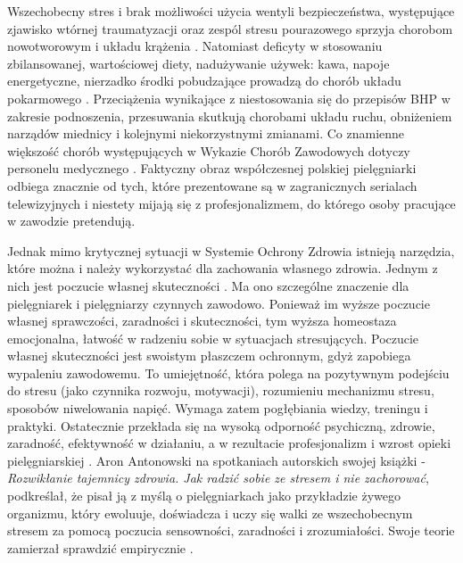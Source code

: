 \documentclass[a4paper,12pt,twoside,openright]{mwrep}
\begin{document}
Wszechobecny stres i brak możliwości użycia wentyli bezpieczeństwa, występujące zjawisko wtórnej traumatyzacji oraz zespól stresu pourazowego sprzyja chorobom nowotworowym i układu krążenia \cite{skutki}. Natomiast deficyty w stosowaniu zbilansowanej, wartościowej diety, nadużywanie używek: kawa, napoje energetyczne, nierzadko środki pobudzające prowadzą do chorób układu pokarmowego \cite{p.p}. Przeciążenia wynikające z niestosowania się do przepisów BHP w zakresie podnoszenia, przesuwania skutkują chorobami układu ruchu, obniżeniem narządów miednicy i kolejnymi niekorzystnymi zmianami. Co znamienne większość chorób występujących w Wykazie Chorób Zawodowych dotyczy personelu medycznego \cite{wykaz}. Faktyczny obraz współczesnej polskiej pielęgniarki odbiega znacznie od tych, które prezentowane są w zagranicznych serialach telewizyjnych i niestety mijają się z profesjonalizmem, do którego osoby pracujące w zawodzie pretendują.

Jednak mimo krytycznej sytuacji w Systemie Ochrony Zdrowia istnieją narzędzia, które można i należy wykorzystać dla zachowania własnego zdrowia. Jednym z nich jest poczucie własnej skuteczności \cite{skutecznosc}. Ma ono szczególne znaczenie dla pielęgniarek i pielęgniarzy czynnych zawodowo. Ponieważ im wyższe poczucie własnej sprawczości, zaradności i skuteczności, tym wyższa homeostaza emocjonalna, łatwość w radzeniu sobie w sytuacjach stresujących. Poczucie własnej skuteczności jest swoistym płaszczem ochronnym, gdyż zapobiega wypaleniu zawodowemu. To umiejętność, która polega na pozytywnym podejściu do stresu (jako czynnika rozwoju, motywacji), rozumieniu mechanizmu stresu, sposobów niwelowania napięć. Wymaga zatem pogłębiania wiedzy, treningu i praktyki. Ostatecznie przekłada się na wysoką odporność psychiczną, zdrowie, zaradność, efektywność w działaniu, a w rezultacie profesjonalizm i wzrost opieki pielęgniarskiej \cite{stres}. Aron Antonowski  na spotkaniach autorskich  swojej książki - \textit {Rozwikłanie tajemnicy zdrowia. Jak radzić sobie ze stresem i nie zachorować}, podkreślał, że pisał ją z myślą o pielęgniarkach jako przykładzie żywego organizmu, który ewoluuje, doświadcza i uczy się walki ze wszechobecnym stresem za pomocą poczucia sensowności, zaradności i zrozumiałości. Swoje teorie zamierzał sprawdzić empirycznie \cite{aron}.

\end{document}
